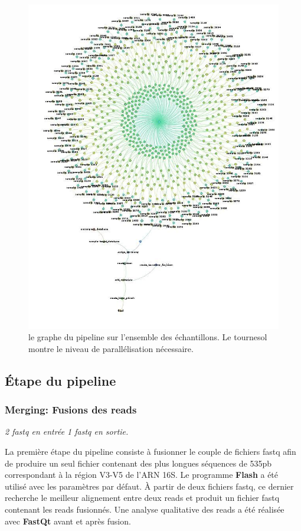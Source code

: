 \documentclass[12pt,a4paper]{article}
\begin{document}
\begin{figure}[ht]
\begin{center}
\includegraphics[scale=0.4]{img/dag.jpg}\hfill
\end{center}
\caption{le graphe du pipeline sur l'ensemble des échantillons. Le tournesol montre le niveau de parallélisation nécessaire.}
\label{dag}
\end{figure}

\subsection{Étape du pipeline}
\subsubsection{Merging: Fusions des reads}
\noindent\emph{ 2 fastq en entrée 1 fastq en sortie. }

La première étape du pipeline consiste à fusionner le couple de fichiers fastq afin de produire un seul fichier contenant des plus longues séquences de 535pb correspondant à la région V3-V5 de l’ARN 16S.
Le programme \textbf{Flash}\cite{Mago2011} a été utilisé avec les paramètres par défaut. À partir de deux fichiers fastq, ce dernier recherche le meilleur alignement entre deux reads et produit un fichier fastq contenant les reads fusionnés.
Une analyse qualitative des reads a été réalisée avec \textbf{FastQt}\citep{Labsquareteam2017} avant et après fusion.
\end{document}
